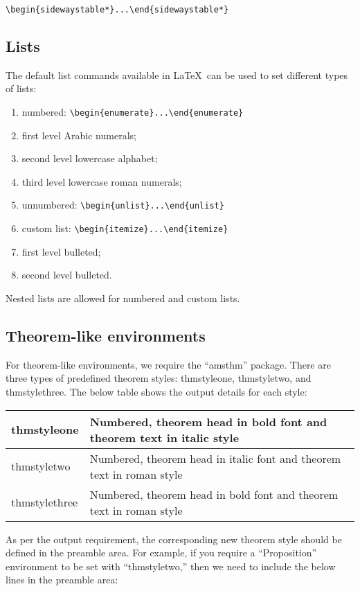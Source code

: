 \documentclass{article}
\begin{document}
\begin{verbatim}
\begin{sidewaystable*}...\end{sidewaystable*}
\end{verbatim}

\subsection{Lists}
The default list commands available in \LaTeX\ can be used to set different types of lists:

\begin{enumerate}
\item numbered: \verb+\begin{enumerate}...\end{enumerate}+
\item[] first level Arabic numerals;
\item[]second level lowercase alphabet;
\item[]third level lowercase roman numerals;
\item unnumbered: \verb+\begin{unlist}...\end{unlist}+
\item custom list: \verb+\begin{itemize}...\end{itemize}+
\item[]first level bulleted;
\item[]second level bulleted.
\end{enumerate}
Nested lists are allowed for numbered and custom lists.

\subsection{Theorem-like environments}

For theorem-like environments, we require the ``amsthm'' package.
There are three types of predefined theorem styles: thmstyleone,
thmstyletwo, and thmstylethree. The below table shows the output
details for each style:
\begin{center}\begin{tabular}{|l|p{22pc}|}
\hline thmstyleone &Numbered, theorem head in bold font and theorem text in italic style\\
\hline
thmstyletwo & Numbered, theorem head in italic font and theorem text in roman style\\
\hline
thmstylethree & Numbered, theorem head in bold font and theorem text in roman style\\
\hline
\end{tabular}\end{center}
As per the output requirement, the corresponding new theorem style should be defined in the preamble area. For example, if you require a ``Proposition'' environment to be set with ``thmstyletwo,'' then we need to include the below lines in the preamble area:
\end{document}
